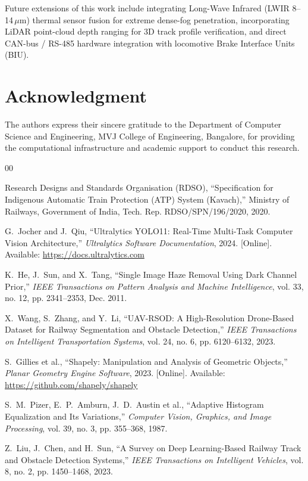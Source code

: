 \documentclass[conference]{IEEEtran}
\begin{document}
Future extensions of this work include integrating Long-Wave Infrared (LWIR 8--14\,$\mu$m) thermal sensor fusion for extreme dense-fog penetration, incorporating LiDAR point-cloud depth ranging for 3D track profile verification, and direct CAN-bus / RS-485 hardware integration with locomotive Brake Interface Units (BIU).

\section*{Acknowledgment}
The authors express their sincere gratitude to the Department of Computer Science and Engineering, MVJ College of Engineering, Bangalore, for providing the computational infrastructure and academic support to conduct this research.


\begin{thebibliography}{00}

Research Designs and Standards Organisation (RDSO), ``Specification for Indigenous Automatic Train Protection (ATP) System (Kavach),'' Ministry of Railways, Government of India, Tech. Rep. RDSO/SPN/196/2020, 2020.

G.~Jocher and J.~Qiu, ``Ultralytics YOLO11: Real-Time Multi-Task Computer Vision Architecture,'' \textit{Ultralytics Software Documentation}, 2024. [Online]. Available: \url{https://docs.ultralytics.com}

K.~He, J.~Sun, and X.~Tang, ``Single Image Haze Removal Using Dark Channel Prior,'' \textit{IEEE Transactions on Pattern Analysis and Machine Intelligence}, vol. 33, no. 12, pp. 2341--2353, Dec. 2011.

X.~Wang, S.~Zhang, and Y.~Li, ``UAV-RSOD: A High-Resolution Drone-Based Dataset for Railway Segmentation and Obstacle Detection,'' \textit{IEEE Transactions on Intelligent Transportation Systems}, vol. 24, no. 6, pp. 6120--6132, 2023.

S.~Gillies et al., ``Shapely: Manipulation and Analysis of Geometric Objects,'' \textit{Planar Geometry Engine Software}, 2023. [Online]. Available: \url{https://github.com/shapely/shapely}

S.~M.~Pizer, E.~P.~Amburn, J.~D.~Austin et al., ``Adaptive Histogram Equalization and Its Variations,'' \textit{Computer Vision, Graphics, and Image Processing}, vol. 39, no. 3, pp. 355--368, 1987.

Z.~Liu, J.~Chen, and H.~Sun, ``A Survey on Deep Learning-Based Railway Track and Obstacle Detection Systems,'' \textit{IEEE Transactions on Intelligent Vehicles}, vol. 8, no. 2, pp. 1450--1468, 2023.

\end{thebibliography}
\end{document}
